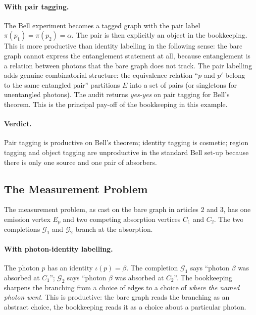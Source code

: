 \documentclass[11pt]{article}
\begin{document}
\paragraph{With pair tagging.} The Bell experiment becomes a tagged graph with the pair label $\pi(p_1) = \pi(p_2) = \alpha$. The pair is then explicitly an object in the bookkeeping. This is more productive than identity labelling in the following sense: the bare graph cannot express the entanglement statement at all, because entanglement is a relation between photons that the bare graph does not track. The pair labelling adds genuine combinatorial structure: the equivalence relation ``$p$ and $p'$ belong to the same entangled pair'' partitions $E$ into a set of pairs (or singletons for unentangled photons). The audit returns \emph{yes-yes} on pair tagging for Bell's theorem. This is the principal pay-off of the bookkeeping in this example.

\paragraph{Verdict.} Pair tagging is productive on Bell's theorem; identity tagging is cosmetic; region tagging and object tagging are unproductive in the standard Bell set-up because there is only one source and one pair of absorbers.

\subsection{The Measurement Problem}

The measurement problem, as cast on the bare graph in articles 2 and 3, has one emission vertex $E_p$ and two competing absorption vertices $C_1$ and $C_2$. The two completions $\mathcal{G}_1$ and $\mathcal{G}_2$ branch at the absorption.

\paragraph{With photon-identity labelling.} The photon $p$ has an identity $\iota(p) = \beta$. The completion $\mathcal{G}_1$ says ``photon $\beta$ was absorbed at $C_1$''; $\mathcal{G}_2$ says ``photon $\beta$ was absorbed at $C_2$''. The bookkeeping sharpens the branching from a choice of edges to a choice of \emph{where the named photon went}. This is productive: the bare graph reads the branching as an abstract choice, the bookkeeping reads it as a choice about a particular photon.
\end{document}
